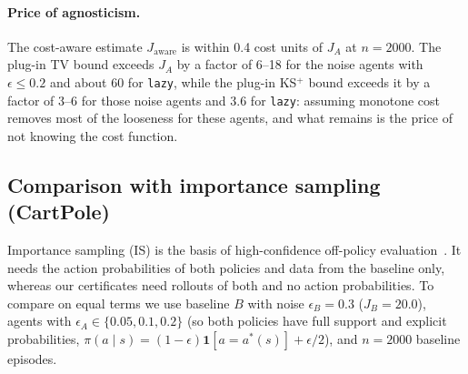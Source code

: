 \documentclass{article}
\begin{document}
\paragraph{Price of agnosticism.} The cost-aware estimate $J_{\text{aware}}$ is within 0.4 cost units of $J_A$ at $n=2000$. The plug-in TV bound exceeds $J_A$ by a factor of 6--18 for the noise agents with $\epsilon\le0.2$ and about 60 for \texttt{lazy}, while the plug-in KS$^+$ bound exceeds it by a factor of 3--6 for those noise agents and 3.6 for \texttt{lazy}: assuming monotone cost removes most of the looseness for these agents, and what remains is the price of not knowing the cost function.

\subsection{Comparison with importance sampling (CartPole)}

Importance sampling (IS) is the basis of high-confidence off-policy evaluation~\citep{thomas2015hcope}. It needs the action probabilities of both policies and data from the baseline only, whereas our certificates need rollouts of both and no action probabilities. To compare on equal terms we use baseline $B$ with noise $\epsilon_B=0.3$ ($J_B=20.0$), agents with $\epsilon_A\in\{0.05,0.1,0.2\}$ (so both policies have full support and explicit probabilities, $\pi(a\mid s)=(1-\epsilon)\mathbf 1[a=a^*(s)]+\epsilon/2$), and $n=2000$ baseline episodes.

\begin{table}[ht]
\centering
\caption{CartPole, importance sampling versus the occupancy certificates, $n=2000$ behavior episodes. SNIS: self-normalised IS estimate of $J_A$. ESS: effective sample size. IS EB upper: ordinary importance-sampling estimate plus an empirical-Bernstein radius at one-sided $\delta=0.05$, using the known range $T\rho_{\max}$. TV bound: plug-in; Finite-sample: Proposition~\ref{prop:fs}.}
\label{tab:is}
\small

\end{table}
\end{document}
